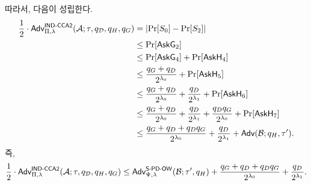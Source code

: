따라서, 다음이 성립한다.
\begin{align*}
	\frac{1}{2} \cdot \textsf{Adv}^{\textsf{IND-CCA2}}_{\Pi, \lambda}(\mathcal{A}; \tau, q_{\mathcal{D}}, q_{H}, q_{G})
	&= \left| \Pr[S_0] - \Pr[S_2] \right| \\
	&\leq \Pr[\textsf{AskG}_2] \\
	&\leq \Pr[\textsf{AskG}_4] + \Pr[\textsf{AskH}_4] \\
	&\leq \frac{q_G + q_D}{2^{\lambda_0}} + \Pr[\textsf{AskH}_5] \\
	&\leq \frac{q_G + q_D}{2^{\lambda_0}} + \frac{q_D}{2^{\lambda_1}} + \Pr[\textsf{AskH}_6] \\
	&\leq \frac{q_G + q_D}{2^{\lambda_0}} + \frac{q_D}{2^{\lambda_1}} + \frac{q_D q_G}{2^{\lambda_0}} + \Pr[\textsf{AskH}_7] \\
	&\leq \frac{q_G + q_D + q_D q_G}{2^{\lambda_0}} + \frac{q_D}{2^{\lambda_1}} + \textsf{Adv}(\mathcal{B}; q_H, \tau').
\end{align*}
즉, 
$$
\frac{1}{2} \cdot \textsf{Adv}^{\textsf{IND-CCA2}}_{\Pi, \lambda}(\mathcal{A}; \tau, q_{\mathcal{D}}, q_{H}, q_{G}) \leq \textsf{Adv}^{\textsf{S-PD-OW}}_{\Psi, \lambda}(\mathcal{B}; \tau', q_{H}) + \frac{q_G + q_D + q_D q_G}{2^{\lambda_0}} + \frac{q_D}{2^{\lambda_1}}.
$$